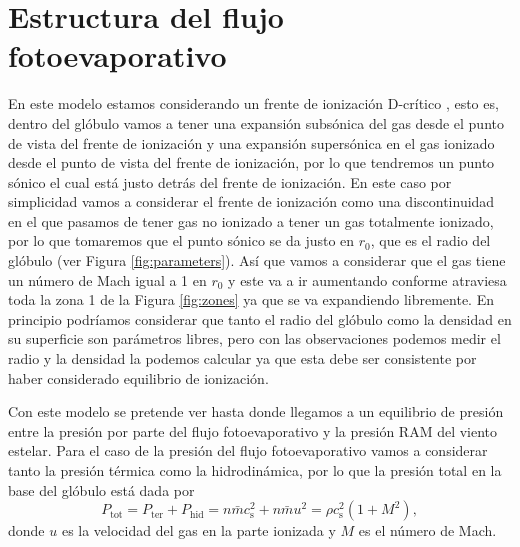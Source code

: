 \documentclass{book}
\begin{document}
\section{Estructura del flujo fotoevaporativo}\label{Estructura}

En este modelo estamos considerando un frente de ionización D-crítico
\citep{Shuu:1992}, esto es, dentro del glóbulo vamos a tener una
expansión subsónica del gas desde el punto de vista del frente de
ionización y una expansión supersónica en el gas ionizado desde el
punto de vista del frente de ionización, por lo que tendremos un punto
sónico el cual está justo detrás del frente de ionización. En este
caso por simplicidad vamos a considerar el frente de ionización como
una discontinuidad en el que pasamos de tener gas no ionizado a tener
un gas totalmente ionizado, por lo que tomaremos que el punto sónico
se da justo en $r_0$, que es el radio del glóbulo (ver Figura
\ref{fig:parameters}). Así que vamos a considerar que el gas tiene un
número de Mach igual a 1 en $r_0$ y este va a ir aumentando conforme
atraviesa toda la zona 1 de la Figura \ref{fig:zones} ya que se va
expandiendo libremente. En principio podríamos considerar que tanto el
radio del glóbulo como la densidad en su superficie son parámetros
libres, pero con las observaciones podemos medir el radio y la
densidad la podemos calcular ya que esta debe ser consistente por
haber considerado equilibrio de ionización.

Con este modelo se pretende ver hasta donde llegamos a un equilibrio
de presión entre la presión por parte del flujo fotoevaporativo y la
presión RAM del viento estelar. Para el caso de la presión del flujo
fotoevaporativo vamos a considerar tanto la presión térmica como la
hidrodinámica, por lo que la presión total en la base del glóbulo está
dada por
\begin{equation}\label{eq: Presion total}
    P_\mathrm{tot}=P_\mathrm{ter}+P_\mathrm{hid}=n\bar{m}c_\mathrm{s}^2+n\bar{m}u^2=\rho c_\mathrm{s}^2(1+M^2),
\end{equation}
donde $u$ es la velocidad del gas en la parte ionizada y $M$ es el
número de Mach.
\end{document}
